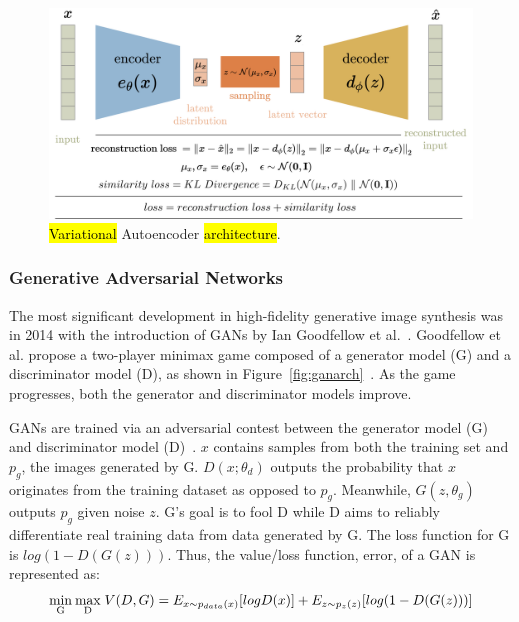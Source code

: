 \documentclass[technologies,article,accept,pdftex,moreauthors]{Definitions/mdpi}
\newcommand{\figref}[1]{Figure~\ref{#1}}
\begin{document}
\begin{figure}[H]
    \includegraphics[width=.99\columnwidth]{vae.png}
    \caption{\label{fig:vae}\hl{Variational} %
 Autoencoder \hl{architecture}.}
\end{figure}

\subsubsection{Generative Adversarial Networks}
\label{VG}
The most significant development in high-fidelity generative image synthesis was in 2014 with the introduction of  GANs by Ian Goodfellow et al.~\cite{goodfellow2014generative}. Goodfellow et al. propose a two-player minimax game composed of a generator model (G) and a discriminator model (D), as shown in \figref{fig:ganarch}~\cite{Yan2021}. As the game progresses, both the generator and discriminator models improve.


GANs are trained via an adversarial contest between the generator model (G) and discriminator model (D)~\cite{goodfellow2014generative}. $x$ contains samples from both the training set and $p_g$, the images generated by G. $D(x;\theta_d)$ outputs the probability that $x$ originates from the training dataset as opposed to $p_g$. Meanwhile, $G(z, \theta_g)$ outputs $p_g$ given noise $z$. G's goal is to fool D while D aims to reliably differentiate real training data from data generated by G. The loss function for G is $log(1 - D(G(z)))$. Thus, the value/loss function, error, of a GAN is represented as:
\begin{equation}
\mathrm{\underset{G}{min} \:\underset{D}{max} } \;V (D, G) = E_{x\sim p_{data}(x)} [log D(x)] \\
+ E_{z\sim p_{z}(z)} [log(1 - D(G(z)))]
\end{equation}  
\vspace{-12pt}
\end{document}
